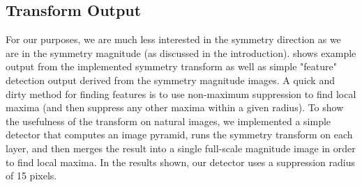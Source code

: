 \subsection{Transform Output}
\label{sec:transform-output}

For our purposes, we are much less interested in the symmetry direction as we are in the symmetry magnitude (as discussed in the introduction).  shows example output from the implemented symmetry transform as well as simple "feature" detection output derived from the symmetry magnitude images. A quick and dirty method for finding features is to use non-maximum suppression to find local maxima (and then suppress any other maxima within a given radius). To show the usefulness of the transform on natural images, we implemented a simple detector that computes an image pyramid, runs the symmetry transform on each layer, and then merges the result into a single full-scale magnitude image in order to find local maxima. In the results shown, our detector uses a suppression radius of 15 pixels. 

